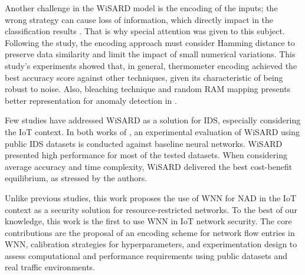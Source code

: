 Another challenge in the WiSARD model is the encoding of the inputs; the wrong strategy can cause loss of information, which directly impact in the classification results \cite{kappaun:2016}. That is why special attention was given to this subject. Following the \cite{kappaun:2016} study, the encoding approach must consider Hamming distance \cite{hamming:1950} to preserve data similarity and limit the impact of small numerical variations. This study's experiments showed that, in general, thermometer encoding achieved the best accuracy score against other techniques, given its characteristic of being robust to noise. Also, bleaching technique and random RAM mapping presents better representation for anomaly detection in \cite{susskind:2022, aleksander:2009}.

Few studies have addressed WiSARD as a solution for IDS, especially considering the IoT context. In both works of \cite{di:2020, di:2021}, an experimental evaluation of WiSARD using public IDS datasets is conducted against baseline neural networks. WiSARD presented high performance for most of the tested datasets. When considering average accuracy and time complexity, WiSARD delivered the best cost-benefit equilibrium, as stressed by the authors.

Unlike previous studies, this work proposes the use of WNN for NAD in the IoT context as a security solution for resource-restricted networks. To the best of our knowledge, this work is the first to use WNN in IoT network security. The core contributions are the proposal of an encoding scheme for network flow entries in WNN, calibration strategies for hyperparameters, and experimentation design to assess computational and performance requirements using public datasets and real traffic environments.